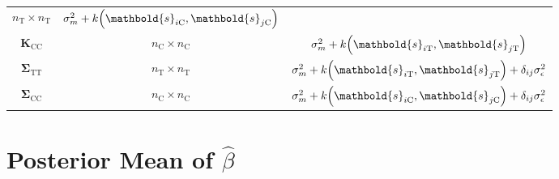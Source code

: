 \documentclass[letter]{article}
\DeclarePairedDelimiter{\parenthesis}{\lparen}{\rparen}
\newcommand{\del}[1]{\parenthesis*{#1}}
\newcommand{\treat}{\mathrm{T}}
\newcommand{\ctrol}{\mathrm{C}}
\newcommand{\sigman}{\sigma_{\epsilon}}
\newcommand{\svec}{\mathbold{s}}
\newcommand{\Kmat}{\mathbold{K}}
\newcommand{\SigmaMat}{\mathbold{\Sigma}}
\newcommand{\STT}{\SigmaMat_{\treat \treat}}
\newcommand{\SCC}{\SigmaMat_{\ctrol \ctrol}}
\newcommand{\KCC}{\Kmat_{\ctrol \ctrol}}
\begin{document}
\begin{longtable}[]{@{}ccc@{}}
\begin{minipage}[t]{0.30\columnwidth}
\(n_\treat \times n_\treat\)\strut
\end{minipage} & \begin{minipage}[t]{0.37\columnwidth}\centering\strut
\(\sigma_m^2 + k\del{\svec_{i\ctrol},\svec_{j\ctrol}}\)\strut
\end{minipage}\tabularnewline
\begin{minipage}[t]{0.25\columnwidth}\centering\strut
\(\KCC\)\strut
\end{minipage} & \begin{minipage}[t]{0.30\columnwidth}\centering\strut
\(n_\ctrol \times n_\ctrol\)\strut
\end{minipage} & \begin{minipage}[t]{0.37\columnwidth}\centering\strut
\(\sigma_m^2 + k\del{\svec_{i\treat},\svec_{j\treat}}\)\strut
\end{minipage}\tabularnewline
\begin{minipage}[t]{0.25\columnwidth}\centering\strut
\(\STT\)\strut
\end{minipage} & \begin{minipage}[t]{0.30\columnwidth}\centering\strut
\(n_\treat \times n_\treat\)\strut
\end{minipage} & \begin{minipage}[t]{0.37\columnwidth}\centering\strut
\(\sigma_m^2 + k\del{\svec_{i\treat},\svec_{j\treat}} + \delta_{ij} \sigman^2\)\strut
\end{minipage}\tabularnewline
\begin{minipage}[t]{0.25\columnwidth}\centering\strut
\(\SCC\)\strut
\end{minipage} & \begin{minipage}[t]{0.30\columnwidth}\centering\strut
\(n_\ctrol \times n_\ctrol\)\strut
\end{minipage} & \begin{minipage}[t]{0.37\columnwidth}\centering\strut
\(\sigma_m^2 + k\del{\svec_{i\ctrol},\svec_{j\ctrol}} + \delta_{ij} \sigman^2\)\strut
\end{minipage}\tabularnewline
\bottomrule
\end{longtable}
    


    	\section{\texorpdfstring{Posterior Mean of \(\hat\beta\)}{Posterior Mean of \textbackslash{}hat\textbackslash{}beta}}\label{posterior-mean-of-hatbeta}
\end{document}
